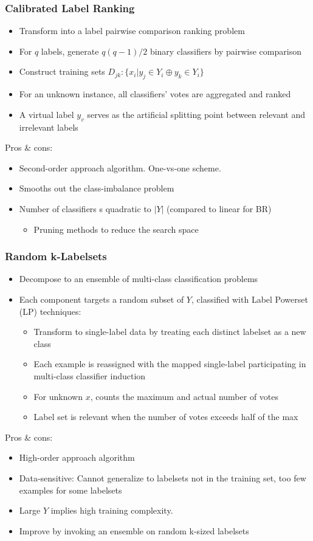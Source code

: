 \documentclass{beamer}
\begin{document}
\begin{frame}
\frametitle{Calibrated Label Ranking}
\begin{itemize}
\item Transform into a label pairwise comparison ranking problem
\item For $q$ labels, generate $q(q-1)/2$ binary classifiers by pairwise comparison
\item Construct training sets $D_{jk} : \{x_i | y_j \in Y_i \oplus y_k \in Y_i\}$
\item For an unknown instance, all classifiers' votes are aggregated and ranked
\item A virtual label $y_v$ serves as the artificial splitting point between relevant and irrelevant labels
\end{itemize}
Pros \& cons:
\begin{itemize}
\item Second-order approach algorithm. One-vs-one scheme.
\item Smooths out the class-imbalance problem
\item Number of classifiers s quadratic to $|Y|$ (compared to linear for BR)
\begin{itemize}
\item Pruning methods to reduce the search space
\end{itemize}
\end{itemize}
\end{frame}
\begin{frame}
\frametitle{Random k-Labelsets}
\begin{itemize}
\item Decompose to an ensemble of multi-class classification problems
\item Each component targets a random subset of $Y$, classified with Label Powerset (LP) techniques:
\begin{itemize}
\item Transform to single-label data by treating each distinct labelset as a new class
\item Each example is reassigned with the mapped single-label participating in multi-class classifier induction
\item For unknown $x$, counts the maximum and actual number of votes
\item Label set is relevant when the number of votes exceeds half of the max
\end{itemize}
\end{itemize}
Pros \& cons:
\begin{itemize}
\item High-order approach algorithm
\item Data-sensitive: Cannot generalize to labelsets not in the training set, too few examples for some labelsets
\item Large $Y$ implies high training complexity.
\item Improve by invoking an ensemble on random k-sized labelsets
\end{itemize}
\end{frame}
\end{document}
